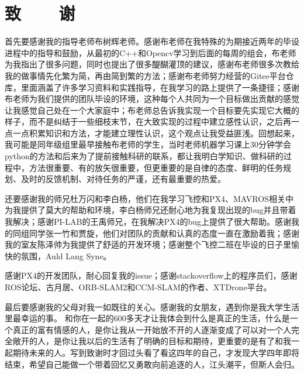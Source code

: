 

\renewcommand{\baselinestretch}{1.5}
\fontsize{12pt}{13pt}\selectfont

\chapter*{致~~~~谢}

首先要感谢我的指导老师布树辉老师。感谢布老师在我特殊的为期接近两年的毕设进程中的指导和鼓励，从最初的C++和Opencv学习到后面的每周的组会，布老师为我指出了很多问题，同时也提出了很多醍醐灌顶的建议，感谢布老师很多次教给我的做事情先化繁为简，再由简到繁的方法；感谢布老师努力经营的Gitee平台仓库，里面涵盖了许多学习资料和实践指导，在我学习的路上提供了一条捷径；感谢布老师为我们提供的团队毕设的环境，这种每个人共同为一个目标做出贡献的感觉让我感觉自己处在一个大家庭中；布老师总告诉我实现一个目标要先实现它大概的样子，而不是纠结于一些细枝末节，在大致实现的过程中建立感性认识，之后再一点一点积累知识和方法，才能建立理性认识，这个观点让我受益匪浅。回想起来，我可能是同年级组里最早接触布老师的学生，当时老师机器学习课上30分钟学会python的方法和后来为了提前接触科研的联系，都让我明白学知识、做科研的过程中，方法很重要、有的放矢很重要，但更重要的是自律的态度、鲜明的任务规划、及时的反馈机制、对待任务的严谨，还有最重要的热爱。

还要感谢我的师兄杜万闪和李白杨，他们在我学习飞控和PX4、MAVROS相关中为我提供了莫大的帮助和环境，李白杨师兄还耐心地为我复现出现的bug并且带着我解决；感谢PI-LAB的王禹师兄，在我解决PX4的bug上提供了很大帮助。感谢我的同组同学张一竹和贾旋，他们对团队的贡献和认真的态度一直在激励着我；感谢我的室友陈泽帅为我提供了舒适的开发环境；感谢整个飞控二班在毕设的日子里愉快的氛围，Auld Lang Syne。

感谢PX4的开发团队，耐心回复我的issue；感谢stackoverflow上的程序员们，感谢ROS论坛、古月居、ORB-SLAM2和CCM-SLAM的作者、XTDrone平台。

最后要感谢我的父母对我一如既往的关心。感谢我的女朋友，遇到你是我大学生活里最幸运的事。
和你在一起的600多天才让我体会到什么是真正的生活，什么是一个真正的富有情感的人，是你让我从一开始放不开的人逐渐变成了可以对一个人完全敞开的人，是你让我以后的生活有了明确的目标和期待，更重要的是有了和我一起期待未来的人。写到致谢时才回过头看了看这四年的自己，才发现大学四年即将结束，希望自己能做一个带着回忆又勇敢向前追逐的人，江头潮平，但斯人会归。
